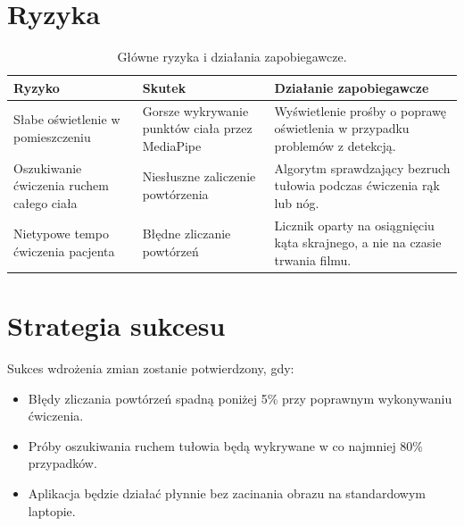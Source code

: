 \documentclass[11pt,a4paper]{article}
\begin{document}
\section{Ryzyka}
\begin{table}[ht]
\centering
\small
\begin{tabularx}{\textwidth}{p{4cm} p{4.5cm} Y}
\toprule
\textbf{Ryzyko} & \textbf{Skutek} & \textbf{Działanie zapobiegawcze} \\
\midrule
Słabe oświetlenie w pomieszczeniu & Gorsze wykrywanie punktów ciała przez MediaPipe & Wyświetlenie prośby o poprawę oświetlenia w przypadku problemów z detekcją. \\
\addlinespace
Oszukiwanie ćwiczenia ruchem całego ciała & Niesłuszne zaliczenie powtórzenia & Algorytm sprawdzający bezruch tułowia podczas ćwiczenia rąk lub nóg. \\
\addlinespace
Nietypowe tempo ćwiczenia pacjenta & Błędne zliczanie powtórzeń & Licznik oparty na osiągnięciu kąta skrajnego, a nie na czasie trwania filmu. \\
\bottomrule
\end{tabularx}
\caption{Główne ryzyka i działania zapobiegawcze.}
\end{table}

\section{Strategia sukcesu}
Sukces wdrożenia zmian zostanie potwierdzony, gdy:
\begin{itemize}
    \item Błędy zliczania powtórzeń spadną poniżej 5\% przy poprawnym wykonywaniu ćwiczenia.
    \item Próby oszukiwania ruchem tułowia będą wykrywane w co najmniej 80\% przypadków.
    \item Aplikacja będzie działać płynnie bez zacinania obrazu na standardowym laptopie.
\end{itemize}

\end{document}
